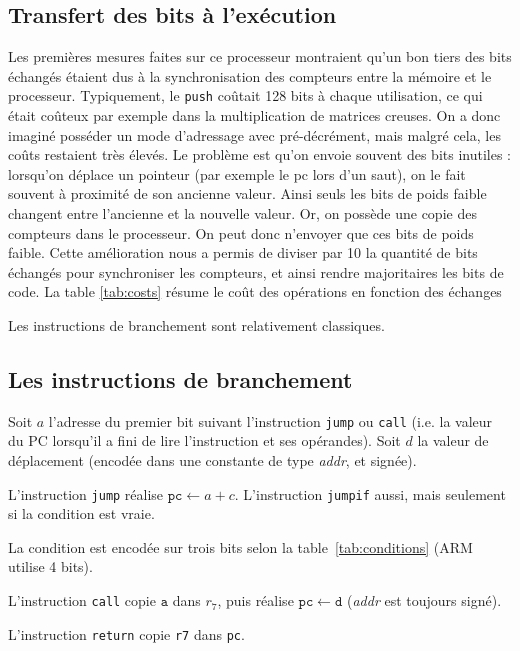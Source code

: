 \documentclass[architecture]{compas2018}
\begin{document}
\subsection{Transfert des bits à l'exécution}

Les premières mesures faites sur ce processeur montraient qu'un bon tiers des bits échangés étaient dus à la synchronisation des compteurs entre la mémoire et le processeur. Typiquement, le \texttt{push} coûtait 128 bits à chaque utilisation, ce qui était coûteux par exemple dans la multiplication de matrices creuses. On a donc imaginé posséder un mode d'adressage avec pré-décrément, mais malgré cela, les coûts restaient très élevés. Le problème est qu'on envoie souvent des bits inutiles : lorsqu'on déplace un pointeur (par exemple le pc lors d'un saut), on le fait souvent à proximité de son ancienne valeur. Ainsi seuls les bits de poids faible changent entre l'ancienne et la nouvelle valeur. Or, on possède une copie des compteurs dans le processeur. On peut donc n'envoyer que ces bits de poids faible. Cette amélioration nous a permis de diviser par 10 la quantité de bits échangés pour synchroniser les compteurs, et ainsi rendre majoritaires les bits de code. La table \ref{tab:costs} résume le coût des opérations en fonction des échanges

%
\iffalse
Les instructions de branchement sont relativement classiques.
\subsection{Les instructions de branchement }
\label{sec:jumpcallret}

Soit $a$ l'adresse du premier bit suivant l'instruction \texttt{jump} ou \texttt{call} (i.e. la valeur du PC lorsqu'il a fini de lire l'instruction et ses opérandes).
Soit $d$ la valeur de déplacement (encodée dans une constante de type \textit{addr}, et signée).

L'instruction \texttt{jump} réalise $\mathtt{pc}\leftarrow a + c$.
L'instruction \texttt{jumpif} aussi, mais seulement si la condition est vraie.

La condition  est encodée sur trois bits  selon la table~\ref{tab:conditions} (ARM utilise 4 bits).

L'instruction \texttt{call} copie $\texttt{a}$ dans $r_{7}$, puis réalise $\mathtt{pc} \leftarrow \texttt{d}$
(\emph{addr} est toujours signé).

L'instruction \texttt{return} copie \texttt{r7} dans \texttt{pc}.
\end{document}
